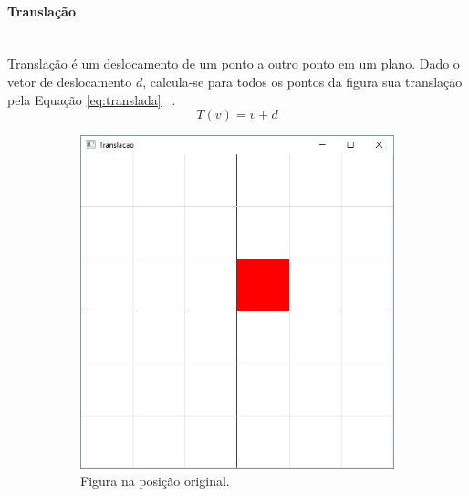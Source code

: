 \paragraph{Translação} \mbox{}\\
Translação é um deslocamento de um ponto a outro ponto em um plano. Dado o vetor de deslocamento $d$, calcula-se para todos os pontos da figura sua translação pela Equação \ref{eq:translada} ~\cite{angel6th}.
  \begin{equation} \label{eq:translada}
      T(v) = v + d
  \end{equation}

\begin{figure}[H]
  \centering
  \begin{subfigure}[t]{.25\textwidth}
    \includegraphics[width=.9\textwidth]{img/linear1a}
    \caption{Figura na posição original.} 
  \end{subfigure}
  ~
  \begin{subfigure}[t]{0.25\textwidth}

\end{subfigure}
\end{figure}
